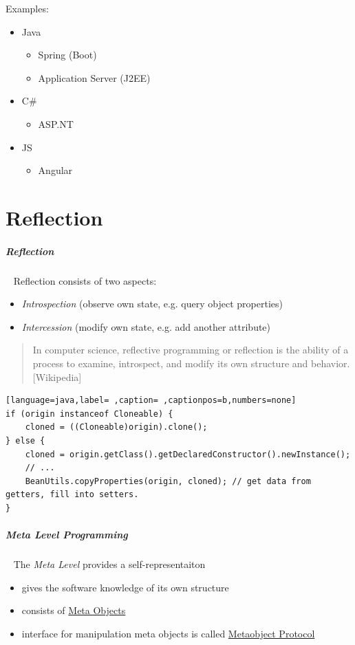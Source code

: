\documentclass[8pt,twoside,landscape]{extarticle}
\begin{document}
\begin{multicols}{4}
Examples:
\begin{itemize}
\item Java
\begin{itemize}
\item Spring (Boot)
\item Application Server (J2EE)
\end{itemize}
\item C\#
\begin{itemize}
\item ASP.NT
\end{itemize}
\item JS
\begin{itemize}
\item Angular
\end{itemize}
\end{itemize}
\section{Reflection}
\label{sec:orga9ee521}
\subparagraph{Reflection} \
\label{sec:org91a004f}
Reflection consists of two aspects:
\begin{itemize}
\item \emph{Introspection} (observe own state, e.g. query object properties)
\item \emph{Intercession} (modify own state, e.g. add another attribute)
\end{itemize}

\begin{quote}
In computer science, reflective programming or reflection is the ability of a process to examine, introspect, and modify its own structure and behavior. [Wikipedia]
\end{quote}


\begin{lstlisting}[language=java,label= ,caption= ,captionpos=b,numbers=none]
if (origin instanceof Cloneable) {
    cloned = ((Cloneable)origin).clone();
} else {
    cloned = origin.getClass().getDeclaredConstructor().newInstance();
    // ...
    BeanUtils.copyProperties(origin, cloned); // get data from getters, fill into setters.
}
\end{lstlisting}
\subparagraph{Meta Level Programming} \
\label{sec:org8cb24b0}
The \emph{Meta Level} provides a self-representaiton
\begin{itemize}
\item gives the software knowledge of its own structure
\item consists of \href{../../../roam/20230115160536-what_are_meta_objects.org}{Meta Objects}
\item interface for manipulation meta objects is called \href{../../../roam/20230115160651-what_is_the_metaobject_protocol.org}{Metaobject Protocol}
\end{itemize}



\end{multicols}
\end{document}
